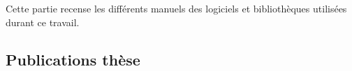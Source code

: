 \label{refs:biblio}
\printbibliography[heading=none, notkeyword={software}]

\label{ref:software}

Cette partie recense les différents manuels des logiciels et
bibliothèques utilisées durant ce travail.

\begin{refsection}
  \newrefcontext[sorting=ynt]
  \printbibliography[heading=none, keyword={software}]
\end{refsection}

\label{ref:publi}

\subsection*{Publications thèse}
\label{ref:publi:ths}

\begin{refsection}
  \nocite{Bunel2019,Bunel2019a,Bunel2019b,Bunel2018a,Bunel2018b}
  \newrefcontext[sorting=ynt]
  \printbibliography[heading=none]
\end{refsection}

